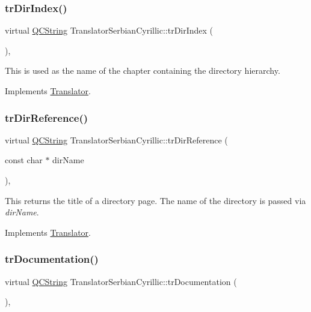 \subsubsection{\texorpdfstring{trDirIndex()}{trDirIndex()}}
{\footnotesize\ttfamily virtual \mbox{\hyperlink{class_q_c_string}{Q\+C\+String}} Translator\+Serbian\+Cyrillic\+::tr\+Dir\+Index (\begin{DoxyParamCaption}{ }\end{DoxyParamCaption})\hspace{0.3cm}{\ttfamily [inline]}, {\ttfamily [virtual]}}

This is used as the name of the chapter containing the directory hierarchy. 

Implements \mbox{\hyperlink{class_translator}{Translator}}.

\mbox{\label{class_translator_serbian_cyrillic_aa4193414ea428e8bbbac4d7880c9d2ec}} 
\subsubsection{\texorpdfstring{trDirReference()}{trDirReference()}}
{\footnotesize\ttfamily virtual \mbox{\hyperlink{class_q_c_string}{Q\+C\+String}} Translator\+Serbian\+Cyrillic\+::tr\+Dir\+Reference (\begin{DoxyParamCaption}\item[{const char $\ast$}]{dir\+Name }\end{DoxyParamCaption})\hspace{0.3cm}{\ttfamily [inline]}, {\ttfamily [virtual]}}

This returns the title of a directory page. The name of the directory is passed via {\itshape dir\+Name}. 

Implements \mbox{\hyperlink{class_translator}{Translator}}.

\mbox{\label{class_translator_serbian_cyrillic_a73d5b165d77c02369bc70a69f01c937a}} 
\subsubsection{\texorpdfstring{trDocumentation()}{trDocumentation()}}
{\footnotesize\ttfamily virtual \mbox{\hyperlink{class_q_c_string}{Q\+C\+String}} Translator\+Serbian\+Cyrillic\+::tr\+Documentation (\begin{DoxyParamCaption}{ }\end{DoxyParamCaption})\hspace{0.3cm}{\ttfamily [inline]}, {\ttfamily [virtual]}}

